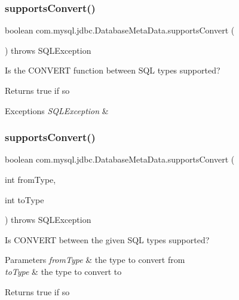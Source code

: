 \subsubsection{\texorpdfstring{supports\+Convert()}{supportsConvert()}\hspace{0.1cm}{\footnotesize\ttfamily [1/2]}}
{\footnotesize\ttfamily boolean com.\+mysql.\+jdbc.\+Database\+Meta\+Data.\+supports\+Convert (\begin{DoxyParamCaption}{ }\end{DoxyParamCaption}) throws S\+Q\+L\+Exception}

Is the C\+O\+N\+V\+E\+RT function between S\+QL types supported?

\begin{DoxyReturn}{Returns}
true if so 
\end{DoxyReturn}

\begin{DoxyExceptions}{Exceptions}
{\em S\+Q\+L\+Exception} & \\
\hline
\end{DoxyExceptions}
\mbox{\label{classcom_1_1mysql_1_1jdbc_1_1_database_meta_data_adb33dab5f2384c65ad906abc90988265}} 
\subsubsection{\texorpdfstring{supports\+Convert()}{supportsConvert()}\hspace{0.1cm}{\footnotesize\ttfamily [2/2]}}
{\footnotesize\ttfamily boolean com.\+mysql.\+jdbc.\+Database\+Meta\+Data.\+supports\+Convert (\begin{DoxyParamCaption}\item[{int}]{from\+Type,  }\item[{int}]{to\+Type }\end{DoxyParamCaption}) throws S\+Q\+L\+Exception}

Is C\+O\+N\+V\+E\+RT between the given S\+QL types supported?


\begin{DoxyParams}{Parameters}
{\em from\+Type} & the type to convert from \\
\hline
{\em to\+Type} & the type to convert to \\
\hline
\end{DoxyParams}
\begin{DoxyReturn}{Returns}
true if so 
\end{DoxyReturn}

